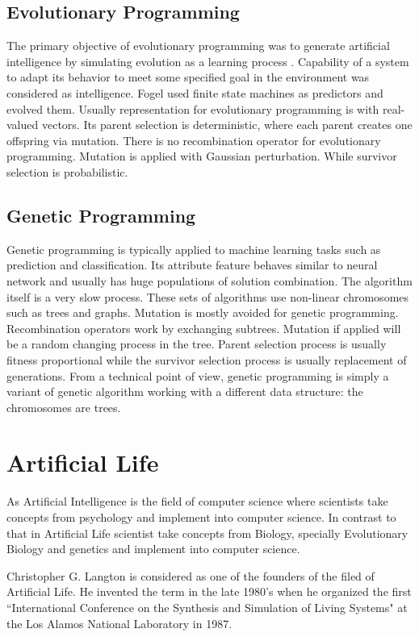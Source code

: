 \subsection{Evolutionary Programming}
The primary objective of evolutionary programming was to generate artificial intelligence by simulating evolution as a learning process \cite{fogel1966}. Capability of a system to adapt its behavior to meet some specified goal in the environment was considered as intelligence. Fogel used finite state machines as predictors and evolved them. Usually representation for evolutionary programming is with real-valued vectors. Its parent selection is deterministic, where each parent creates one offspring via mutation. There is no recombination operator for evolutionary programming. Mutation is applied with Gaussian perturbation. While survivor selection is probabilistic. 

\subsection{Genetic Programming}
Genetic programming is typically applied to machine learning tasks such as prediction and classification. Its attribute feature behaves similar to neural network and usually has huge populations of solution combination. The algorithm itself is a very slow process. These sets of algorithms use non-linear chromosomes such as trees and graphs. Mutation is mostly avoided for genetic programming. Recombination operators work by exchanging subtrees. Mutation if applied will be a random changing process in the tree. Parent selection process is usually fitness proportional while the survivor selection process is usually replacement of generations. From a technical point of view, genetic programming is simply a variant of genetic algorithm working with a different data structure: the chromosomes are trees. 

\section{Artificial Life}
As Artificial Intelligence is the field of computer science where scientists take concepts from psychology and implement into computer science. In contrast to that in Artificial Life scientist take concepts from Biology, specially Evolutionary Biology and genetics and implement into computer science. 

Christopher G. Langton is considered as one of the founders of the filed of Artificial Life. He invented the term in the late 1980's when he organized the first ``International Conference on the Synthesis and Simulation of Living Systems" at the Los Alamos National Laboratory in 1987.

